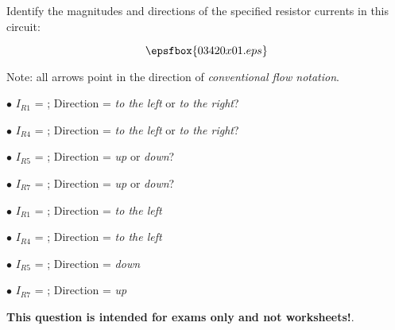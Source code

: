 

Identify the magnitudes and directions of the specified resistor currents in this circuit:

$$\epsfbox{03420x01.eps}$$

Note: all arrows point in the direction of {\it conventional flow notation}.

\medskip
\item{$\bullet$} $I_{R1}$ = \underbar{\hskip 70pt} ; Direction = {\it to the left} or {\it to the right}?
\vskip 5pt
\item{$\bullet$} $I_{R4}$ = \underbar{\hskip 70pt} ; Direction = {\it to the left} or {\it to the right}?
\vskip 5pt
\item{$\bullet$} $I_{R5}$ = \underbar{\hskip 70pt} ; Direction = {\it up} or {\it down}?
\vskip 5pt
\item{$\bullet$} $I_{R7}$ = \underbar{\hskip 70pt} ; Direction = {\it up} or {\it down}?
\medskip







\medskip
\item{$\bullet$} $I_{R1}$ =  ; Direction = {\it to the left}
\vskip 5pt
\item{$\bullet$} $I_{R4}$ =  ; Direction = {\it to the left}
\vskip 5pt
\item{$\bullet$} $I_{R5}$ =  ; Direction = {\it down}
\vskip 5pt
\item{$\bullet$} $I_{R7}$ =  ; Direction = {\it up}
\medskip







{\bf This question is intended for exams only and not worksheets!}.



